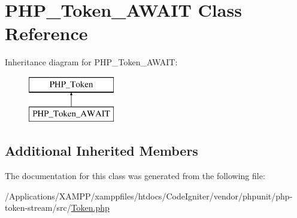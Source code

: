 \hypertarget{class_p_h_p___token___a_w_a_i_t}{}\section{P\+H\+P\+\_\+\+Token\+\_\+\+A\+W\+A\+IT Class Reference}
\label{class_p_h_p___token___a_w_a_i_t}
Inheritance diagram for P\+H\+P\+\_\+\+Token\+\_\+\+A\+W\+A\+IT\+:\begin{figure}[H]
\begin{center}
\leavevmode
\includegraphics[height=2.000000cm]{class_p_h_p___token___a_w_a_i_t}
\end{center}
\end{figure}
\subsection*{Additional Inherited Members}


The documentation for this class was generated from the following file\+:\begin{DoxyCompactItemize}
\item 
/\+Applications/\+X\+A\+M\+P\+P/xamppfiles/htdocs/\+Code\+Igniter/vendor/phpunit/php-\/token-\/stream/src/\mbox{\hyperlink{_token_8php}{Token.\+php}}\end{DoxyCompactItemize}
